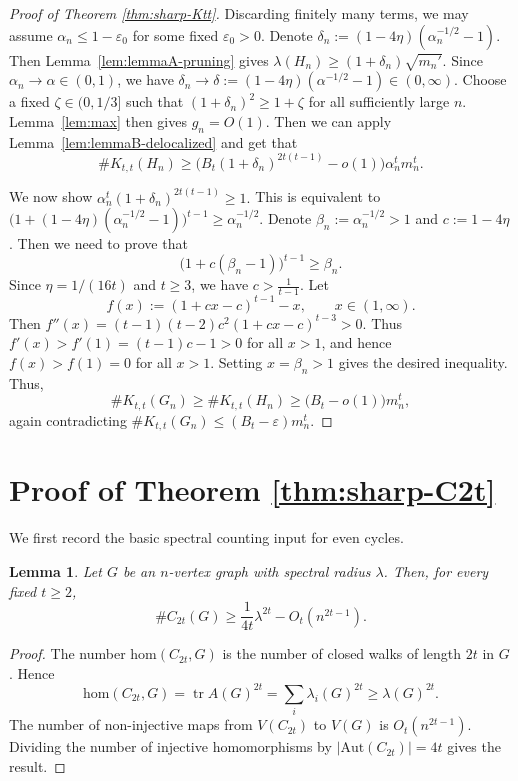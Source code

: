 \documentclass[10pt,a4paper]{amsart}
\newtheorem{lemma}[theorem]{Lemma}
\newcommand{\Ktt}{K_{t,t}}
\newcommand{\homc}{\mathrm{hom}}
\newcommand{\Aut}{\mathrm{Aut}}
\begin{document}
\begin{proof}[Proof of Theorem \ref{thm:sharp-Ktt}]
\smallskip

Discarding finitely many terms, we may assume $\alpha_n\le 1-\varepsilon_0$ for some fixed $\varepsilon_0>0$.
Denote $\delta_n:=(1-4\eta)(\alpha_n^{-1/2}-1).$
Then Lemma~\ref{lem:lemmaA-pruning} gives
$\lambda(H_n)\ge (1+\delta_n)\sqrt{m_n'}.$
Since $\alpha_n\to\alpha\in(0,1)$, we have $\delta_n\to\delta :=(1-4\eta)(\alpha^{-1/2} -1)\in(0,\infty).$
Choose a fixed \(\zeta\in(0,1/3]\) such that $(1+\delta_n)^2\ge 1+\zeta$
for all sufficiently large \(n\). Lemma~\ref{lem:max} then gives \(g_n=O(1)\).
Then we can apply Lemma~\ref{lem:lemmaB-delocalized} and get that 
\[
 \texttt{\#}\Ktt(H_n)
 \ge
 \bigl(B_t(1+\delta_n)^{2t(t-1)}-o(1)\bigr)\alpha_n^t m_n^t.
\] 

We now show $\alpha_n^t(1+\delta_n)^{2t(t-1)}\ge 1.$
This is equivalent to $\big(1+(1-4\eta)(\alpha_n^{-1/2} -1)\big)^{t-1} \ge \alpha_n^{-1/2}.$
Denote $\beta_n:=\alpha_n^{-1/2}> 1$ and $c:=1-4\eta$. 
Then we need to prove that 
\[
        \big(1+c(\beta_n-1) \big)^{t-1} \ge \beta_n.
\]
Since \(\eta=1/(16t)\) and $t\ge 3$, we have $c> \frac{1}{t-1}.$
Let
\[
        f(x):=(1+cx-c )^{t-1}-x,
        \qquad x\in (1,\infty).
\]
Then        $f''(x) =(t-1)(t-2)c^2(1+cx-c)^{t-3} > 0.$
Thus
$f'(x)> f'(1)=(t-1)c-1>0$
for all \(x>1\), and hence
$f(x)>f(1)=0$
for all \(x>1\). Setting \(x=\beta_n>1\) gives the desired inequality.
Thus,
\[
     \texttt{\#}\Ktt(G_n)
        \ge
        \texttt{\#}K_{t,t}(H_n)
        \ge
        \bigl(B_t-o(1)\bigr)m_n^t,
\]
again contradicting \(\texttt{\#}\Ktt(G_n)\le (B_t-\varepsilon)m_n^t\).
\end{proof}



\section{Proof of Theorem \ref{thm:sharp-C2t}}

\label{sec:even-cycles}

We first record the basic spectral counting input for even cycles.

\begin{lemma}
\label{lem:spectral-count-C2t}
Let \(G\) be an \(n\)-vertex graph with spectral radius \(\lambda\).
Then, for every fixed \(t\ge2\),
\[
        \texttt{\#}C_{2t}(G)
        \ge
        \frac{1}{4t}\lambda^{2t}-O_t(n^{2t-1}).
\]
\end{lemma}

\begin{proof}
The number \(\homc(C_{2t},G)\) is the number of closed walks of length
\(2t\) in \(G\).  Hence
\[
        \homc(C_{2t},G)
        =
        \operatorname{tr}A(G)^{2t}
        =
        \sum_i \lambda_i(G)^{2t}
        \ge
        \lambda(G)^{2t}.
\]
The number of non-injective maps from \(V(C_{2t})\) to \(V(G)\) is
\(O_t(n^{2t-1})\).  Dividing the number of injective homomorphisms by
\(|\Aut(C_{2t})|=4t\) gives the result.
\end{proof}
\end{document}
